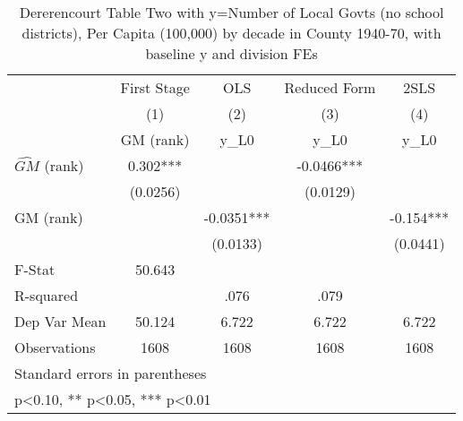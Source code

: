 \begin{table}[htbp]\centering
\def\sym#1{\ifmmode^{#1}\else\(^{#1}\)\fi}
\caption{Dererencourt Table Two with y=Number of Local Govts (no school districts), Per Capita (100,000) by decade in County 1940-70, with baseline y and division FEs}
\begin{tabular}{l*{4}{c}}
\toprule
                    & First Stage   &         OLS   &Reduced Form   &        2SLS   \\
                    &\multicolumn{1}{c}{(1)}&\multicolumn{1}{c}{(2)}&\multicolumn{1}{c}{(3)}&\multicolumn{1}{c}{(4)}\\
                    &\multicolumn{1}{c}{GM  (rank)}&\multicolumn{1}{c}{y\_L0}&\multicolumn{1}{c}{y\_L0}&\multicolumn{1}{c}{y\_L0}\\
\midrule
$\hat{GM}$ (rank)   &       0.302***&               &     -0.0466***&               \\
                    &    (0.0256)   &               &    (0.0129)   &               \\
\addlinespace
GM  (rank)          &               &     -0.0351***&               &      -0.154***\\
                    &               &    (0.0133)   &               &    (0.0441)   \\
\midrule
F-Stat              &      50.643   &               &               &               \\
R-squared           &               &        .076   &        .079   &               \\
Dep Var Mean        &      50.124   &       6.722   &       6.722   &       6.722   \\
Observations        &        1608   &        1608   &        1608   &        1608   \\
\bottomrule
\multicolumn{5}{l}{\footnotesize Standard errors in parentheses}\\
\multicolumn{5}{l}{\footnotesize * p<0.10, ** p<0.05, *** p<0.01}\\
\end{tabular}
\end{table}
